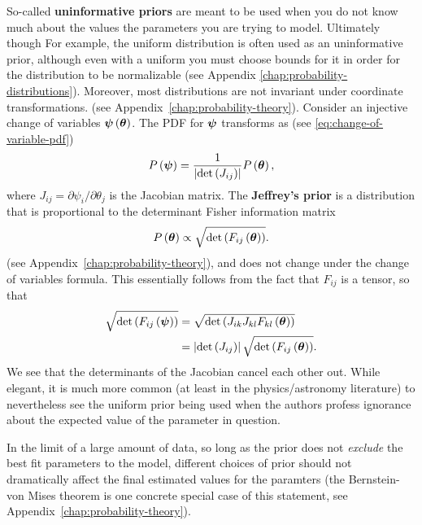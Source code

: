 So-called \textbf{uninformative priors} are meant to be used when you do
not know much about the values the parameters you are trying to model.
Ultimately though 
For example, the uniform distribution is often used as an uninformative prior,
although even with a uniform you must choose bounds for it in order for the
distribution to be normalizable (see Appendix \ref{chap:probability-distributions}).
Moreover, most distributions are not invariant under coordinate transformations.
(see Appendix~\ref{chap:probability-theory}).
Consider an injective change of variables ${\bm \psi}\left({\bm \theta}\right)$.
The PDF for ${\bm \psi}$ transforms as (see \eqref{eq:change-of-variable-pdf})
\begin{align}
    P\left({\bm \psi}\right)
    =
    \frac{1}{\left|\det\left(J_{ij}\right)\right|} P\left({\bm \theta}\right)
    ,
\end{align}
where $J_{ij} = \partial\psi_i/\partial\theta_j$ is the Jacobian matrix.
The \textbf{Jeffrey's prior} is a distribution that is proportional to the determinant Fisher information matrix 
\begin{align}
    P\left({\bm \theta}\right)\propto \sqrt{\det\left(F_{ij}\left({\bm \theta}\right)\right)}
    .
\end{align}
(see Appendix~\ref{chap:probability-theory}), 
and does not change under the change of variables formula.
This essentially follows from the fact that $F_{ij}$ is a tensor, so that
\begin{align}
    \sqrt{\det\left(F_{ij}\left({\bm \psi}\right)\right)}
    &=
    \sqrt{\det\left(J_{ik}J_{kl}F_{kl}\left({\bm \theta}\right)\right)}
    \nonumber\\
    &=
    \left|\det\left(J_{ij}\right)\right|
    \sqrt{\det\left(F_{ij}\left({\bm \theta}\right)\right)}
    .
\end{align}
We see that the determinants of the Jacobian cancel each other out.
While elegant, it is much more common (at least in the physics/astronomy literature) to nevertheless see the uniform prior being used when the authors profess
ignorance about the expected value of the parameter in question.

In the limit of a large amount of data, so long as the prior
does not \emph{exclude} the best fit parameters to the model, different choices of prior should not dramatically affect the final estimated values for the paramters (the Bernstein-von Mises theorem is one concrete special case of this statement, see Appendix~\ref{chap:probability-theory}).

